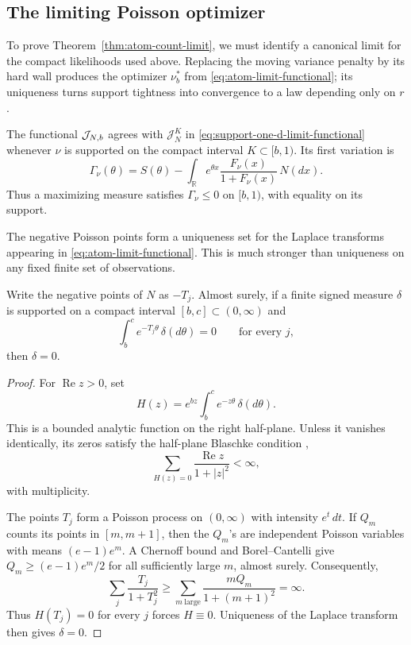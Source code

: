 \subsection{The limiting Poisson optimizer}
\label{sec:atom-count-law}

To prove Theorem~\ref{thm:atom-count-limit}, we must identify a canonical
limit for the compact likelihoods used above. Replacing the moving variance
penalty by its hard wall produces the optimizer \(\nu_b^*\) from
\eqref{eq:atom-limit-functional}; its uniqueness turns support tightness into
convergence to a law depending only on \(r\).

The functional \(\mathcal J_{N,b}\) agrees with \(\mathcal J_N^K\) in
\eqref{eq:support-one-d-limit-functional} whenever \(\nu\) is supported on
the compact interval \(K\subset[b,1)\). Its first variation is
\begin{equation}
\label{eq:atom-limit-kkt}
    \Gamma_\nu(\theta)
    =S(\theta)-\int_{\mathbb R}
       e^{\theta x}\frac{F_\nu(x)}{1+F_\nu(x)}\,N(dx).
\end{equation}
Thus a maximizing measure satisfies \(\Gamma_\nu\le0\) on \([b,1)\),
with equality on its support.

The negative Poisson points form a uniqueness set for the Laplace transforms
appearing in \eqref{eq:atom-limit-functional}. This is much stronger than
uniqueness on any fixed finite set of observations.
\begin{lemma}
\label{lem:atom-uniqueness-set}
Write the negative points of \(N\) as \(-T_j\). Almost surely, if a finite
signed measure \(\delta\) is supported on a compact interval
\([b,c]\subset(0,\infty)\) and
\[
    \int_b^c e^{-T_j\theta}\,\delta(d\theta)=0
    \qquad\text{for every }j,
\]
then \(\delta=0\).
\end{lemma}

\begin{proof}
For \(\operatorname{Re}z>0\), set
\[
    H(z)=e^{bz}\int_b^c e^{-z\theta}\,\delta(d\theta).
\]
This is a bounded analytic function on the right half-plane. Unless it
vanishes identically, its zeros satisfy the half-plane Blaschke condition
\cite[Chapter~II]{garnett2007bounded},
\[
    \sum_{H(z)=0}\frac{\operatorname{Re}z}{1+|z|^2}<\infty,
\]
with multiplicity.

The points \(T_j\) form a Poisson process on \((0,\infty)\) with intensity
\(e^t\,dt\). If \(Q_m\) counts its points in \([m,m+1]\), then the
\(Q_m\)'s are independent Poisson variables with means \((e-1)e^m\).
A Chernoff bound and Borel--Cantelli give
\(Q_m\ge(e-1)e^m/2\) for all sufficiently large \(m\), almost surely.
Consequently,
\[
    \sum_j\frac{T_j}{1+T_j^2}
    \ge\sum_{m\ \mathrm{large}}
       \frac{mQ_m}{1+(m+1)^2}=\infty.
\]
Thus \(H(T_j)=0\) for every \(j\) forces \(H\equiv0\). Uniqueness of the
Laplace transform then gives \(\delta=0\).
\end{proof}


